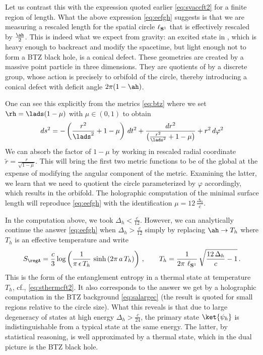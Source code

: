 \documentclass[12pt,openany]{book}
\begin{document}
Let us contrast this with the expression quoted earlier \eqref{eq:svaccft2} for a finite region of length. What the above expression
\eqref{eq:eefgh} suggests is that we are measuring a rescaled length for the spatial circle $\ell_{{\bf S}^1} $ that is effectively rescaled by
$\frac{\ah}{2}$.  This is indeed what we expect from gravity: an excited state in , which is heavy enough to backreact and modify the spacetime, but light enough not to form a BTZ black hole, is a conical defect. These geometries are created by  a massive point particle in three dimensions. They are quotients of  by a discrete group, whose action is precisely to orbifold of the circle, thereby introducing a conical defect with deficit angle $2\pi(1-\ah)$.

One can see this explicitly from the metrics \eqref{eq:btz} where we set $\rh = \lads (1-\mu) $ with $\mu \in (0,1)$ to obtain 
%
\begin{equation}
ds^2 = -\left(\frac{r^2}{\lads^2} + 1- \mu\right) \, dt^2 + \frac{dr^2}{\left(\frac{r^2}{\lads^2} + 1- \mu\right) } + r^2\, d\varphi^2
\end{equation}
%
We can absorb the factor of $1-\mu$ by working in rescaled radial coordinate $\tilde{r} =\frac{r}{\sqrt{1-\mu}}$. This will bring the first two metric functions to be of the global  at the expense of modifying the angular component of the metric. Examining the latter, we learn that we need  to quotient the circle parameterized by $\varphi$ accordingly, which results in the orbifold. The holographic computation of the minimal surface length will reproduce \eqref{eq:eefgh} with the identification $\mu = 12\,\frac{\Delta_h}{c}$.

In the computation above, we took $\Delta_h < \frac{c}{12}$. However, we can analytically continue the answer \eqref{eq:eefgh} when
$\Delta_h >  \frac{c}{12}$ simply by replacing $\ah \to T_h$ where $T_h$ is an effective temperature and write
%
\begin{equation}
S_\regA=\frac{c}{3}\log \left(\frac{1}{\pi\,\epsilon\, T_h} \, \sinh\left(2\pi\,a\, T_h\right)\right) \,, \qquad
T_h = \frac{1}{2\pi\ \ell_{{\bf S}^1}} \, \sqrt{\frac{12\, \Delta_h}{c}-1} \,.
 \end{equation}
%
This is the form of the entanglement entropy in a thermal state at temperature $T_h$, cf., \eqref{eq:sthermcft2}.  It also corresponds to the answer we get by a holographic computation in the BTZ background \eqref{eq:salargec}  (the result is quoted for small regions relative to the circle size).  What this reveals is that due to large degeneracy of states at high energy $\Delta_h > \frac{c}{24}$, the primary state $\ket{\psi_h}$ is indistinguishable from a typical state at the same energy. The latter, by statistical reasoning, is well approximated by a thermal state, which in the dual picture is the   BTZ black hole.
\end{document}

